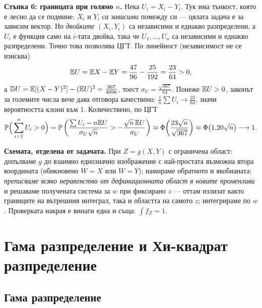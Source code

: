 \begin{supp}
\textbf{Стъпка 6: границата при голямо $n$.} Нека $U_i = X_i - Y_i$. Тук има тънкост, която
е лесно да се подмине: $X_i$ и $Y_i$ \emph{са зависими} помежду си — цялата задача е за
зависим вектор. Но \emph{двойките} $(X_i,Y_i)$ са независими и еднакво разпределени, а $U_i$
е функция само на $i$-тата двойка, така че $U_1,\dots,U_n$ са независими и еднакво
разпределени. Точно това позволява ЦГТ. По линейност (независимост не се изисква)
\[
\mathbb{E} U = \mathbb{E} X - \mathbb{E} Y = \frac{47}{96} - \frac{25}{192} = \frac{23}{64} > 0,
\]
а $\mathbb{D} U = \mathbb{E}[(X-Y)^2] - (\mathbb{E} U)^2 = \frac{367}{4096}$, тоест $\sigma_U = \frac{\sqrt{367}}{64}$.
Понеже $\mathbb{E} U > 0$, законът за големите числа вече дава отговора качествено:
$\frac1n\sum U_i \to \frac{23}{64}$, значи вероятността клони към $1$. Количествено, по ЦГТ
\[
\mathbb{P}\Big(\sum_{i=1}^n U_i > 0\Big)
= \mathbb{P}\left(\frac{\sum U_i - n\mathbb{E} U}{\sigma_U\sqrt n} > -\frac{\sqrt n\,\mathbb{E} U}{\sigma_U}\right)
\approx \Phi\!\left(\frac{23\sqrt n}{\sqrt{367}}\right) \approx \Phi\big(1{,}20\sqrt n\big) \longrightarrow 1 .
\]

\textbf{Схемата, отделена от задачата.} При $Z = g(X,Y)$ с ограничена област:
допълваме $g$ до взаимно еднозначно изображение с най-простата възможна втора координата
(обикновено $W = X$ или $W = Y$); намираме обратното и якобианата; \emph{преписваме всяко
неравенство от дефиниционната област в новите променливи} и решаваме получената система за
$w$ при фиксирано $z$ — оттам излизат както границите на вътрешния интеграл, така и
областта на самото $z$; интегрираме по $w$. Проверката накрая е винаги една и съща:
$\int f_Z = 1$.
\end{supp}


\section{Гама разпределение и Хи-квадрат разпределение}

\subsection{Гама разпределение}

